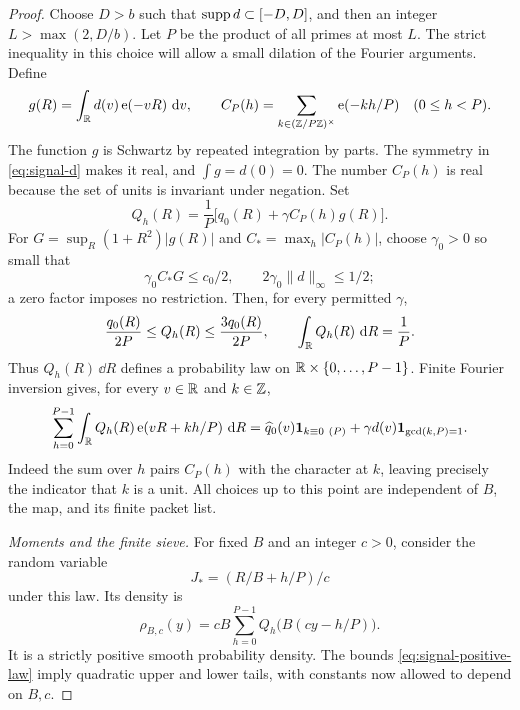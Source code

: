 \begin{proof}
Choose $D>b$ such that $\operatorname{supp} d\subset[-D,D]$, and then an integer
$L>\max(2,D/b)$.  Let $P$ be the product of all primes at most $L$.
The strict inequality in this choice will allow a small dilation of
the Fourier arguments.  Define
\[
 g(R)=\int_\mathbb R d(v)\operatorname{e}(-vR)\,\,\mathrm d v,
 \qquad
 C_P(h)=\sum_{k\in(\mathbb Z/P\mathbb Z)^\times}\operatorname{e}(-kh/P)
 \quad(0\le h<P).
\]
The function $g$ is Schwartz by repeated integration by parts.  The
symmetry in \eqref{eq:signal-d} makes it real, and
$\int g=d(0)=0$.  The number $C_P(h)$ is real because the set of units
is invariant under negation.  Set
\begin{equation}
 Q_h(R)=\frac1P\bigl[q_0(R)+\gamma C_P(h)g(R)\bigr].
 \label{eq:signal-joint-law}
\end{equation}
For $G=\sup_R(1+R^2)|g(R)|$ and $C_* =\max_h|C_P(h)|$, choose
$\gamma_0>0$ so small that
\[
 \gamma_0 C_*G\le c_0/2,
 \qquad 2\gamma_0\|d\|_\infty\le1/2;
\]
a zero factor imposes no restriction.  Then, for every permitted
$\gamma$,
\begin{equation}
 \frac{q_0(R)}{2P}\le Q_h(R)\le\frac{3q_0(R)}{2P},
 \qquad \int_\mathbb R Q_h(R)\,\,\mathrm d R=\frac1P.
 \label{eq:signal-positive-law}
\end{equation}
Thus $Q_h(R)\,\dd R$ defines a probability law on
$\mathbb R\times\{0,\ldots,P-1\}$.  Finite Fourier inversion gives, for every
$v\in\mathbb R$ and $k\in\mathbb Z$,
\begin{equation}
 \sum_{h=0}^{P-1}\int_\mathbb R Q_h(R)\operatorname{e}(vR+kh/P)\,\,\mathrm d R
 =\widehat q_0(v)\mathbf 1_{k\equiv0\ (P)}
       +\gamma d(v)\mathbf 1_{\gcd(k,P)=1}.
 \label{eq:signal-joint-fourier}
\end{equation}
Indeed the sum over $h$ pairs $C_P(h)$ with the character at $k$,
leaving precisely the indicator that $k$ is a unit.  All choices up to
this point are independent of $B$, the map, and its finite packet list.

\emph{Moments and the finite sieve.}
For fixed $B$ and an integer $c>0$, consider the random variable
\begin{equation}
 J_*=(R/B+h/P)/c
 \label{eq:signal-ideal-jitter}
\end{equation}
under this law.  Its density is
\[
 \rho_{B,c}(y)=cB\sum_{h=0}^{P-1}Q_h\bigl(B(cy-h/P)\bigr).
\]
It is a strictly positive smooth probability density.  The bounds
\eqref{eq:signal-positive-law} imply quadratic upper and lower tails,
with constants now allowed to depend on $B,c$.


\end{proof}
